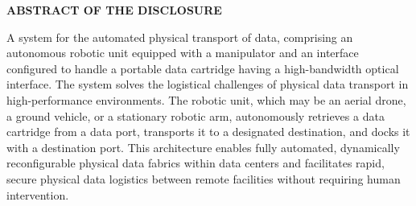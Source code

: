 \documentclass[11pt,letterpaper]{article}
\begin{document}
\thispagestyle{empty}

\begin{center}
    \textbf{\large ABSTRACT OF THE DISCLOSURE}
\end{center}

\vspace{0.6cm}

A system for the automated physical transport of data, comprising an autonomous robotic unit equipped with a manipulator and an interface configured to handle a portable data cartridge having a high-bandwidth optical interface. The system solves the logistical challenges of physical data transport in high-performance environments. The robotic unit, which may be an aerial drone, a ground vehicle, or a stationary robotic arm, autonomously retrieves a data cartridge from a data port, transports it to a designated destination, and docks it with a destination port. This architecture enables fully automated, dynamically reconfigurable physical data fabrics within data centers and facilitates rapid, secure physical data logistics between remote facilities without requiring human intervention.
\end{document}
